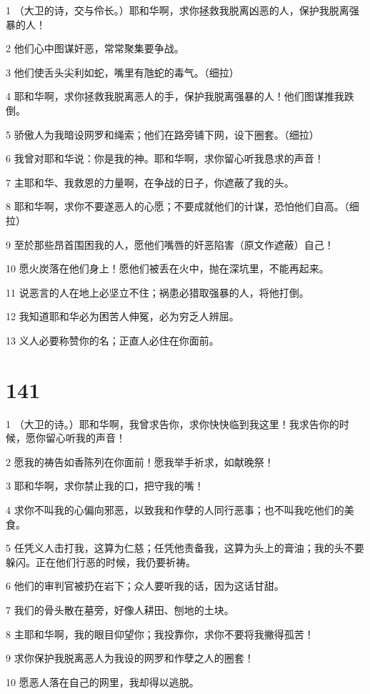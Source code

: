\par 1 （大卫的诗，交与伶长。）耶和华啊，求你拯救我脱离凶恶的人，保护我脱离强暴的人！
\par 2 他们心中图谋奸恶，常常聚集要争战。
\par 3 他们使舌头尖利如蛇，嘴里有虺蛇的毒气。（细拉）
\par 4 耶和华啊，求你拯救我脱离恶人的手，保护我脱离强暴的人！他们图谋推我跌倒。
\par 5 骄傲人为我暗设网罗和绳索；他们在路旁铺下网，设下圈套。（细拉）
\par 6 我曾对耶和华说：你是我的神。耶和华啊，求你留心听我恳求的声音！
\par 7 主耶和华、我救恩的力量啊，在争战的日子，你遮蔽了我的头。
\par 8 耶和华啊，求你不要遂恶人的心愿；不要成就他们的计谋，恐怕他们自高。（细拉）
\par 9 至於那些昂首围困我的人，愿他们嘴唇的奸恶陷害（原文作遮蔽）自己！
\par 10 愿火炭落在他们身上！愿他们被丢在火中，抛在深坑里，不能再起来。
\par 11 说恶言的人在地上必坚立不住；祸患必猎取强暴的人，将他打倒。
\par 12 我知道耶和华必为困苦人伸冤，必为穷乏人辨屈。
\par 13 义人必要称赞你的名；正直人必住在你面前。

\chapter{141}

\par 1 （大卫的诗。）耶和华啊，我曾求告你，求你快快临到我这里！我求告你的时候，愿你留心听我的声音！
\par 2 愿我的祷告如香陈列在你面前！愿我举手祈求，如献晚祭！
\par 3 耶和华啊，求你禁止我的口，把守我的嘴！
\par 4 求你不叫我的心偏向邪恶，以致我和作孽的人同行恶事；也不叫我吃他们的美食。
\par 5 任凭义人击打我，这算为仁慈；任凭他责备我，这算为头上的膏油；我的头不要躲闪。正在他们行恶的时候，我仍要祈祷。
\par 6 他们的审判官被扔在岩下；众人要听我的话，因为这话甘甜。
\par 7 我们的骨头散在墓旁，好像人耕田、刨地的土块。
\par 8 主耶和华啊，我的眼目仰望你；我投靠你，求你不要将我撇得孤苦！
\par 9 求你保护我脱离恶人为我设的网罗和作孽之人的圈套！
\par 10 愿恶人落在自己的网里，我却得以逃脱。

